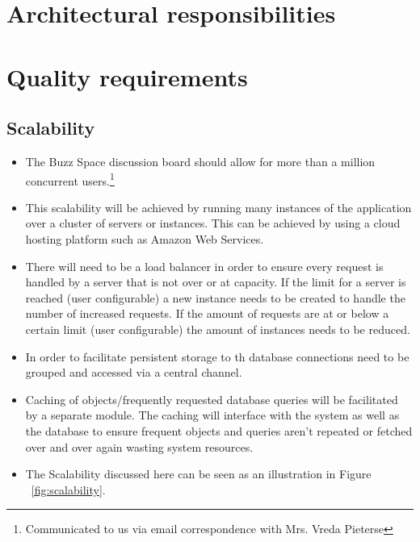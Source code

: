 \documentclass[a4paper,12pt,titlepage]{article}
\begin{document}
\section{Architectural responsibilities}

\pagebreak
\section{Quality requirements}
\subsection{Scalability}
\begin{itemize}
	\item The Buzz Space discussion board should allow for more than a million concurrent users.\footnote{Communicated to us via email correspondence with Mrs. Vreda Pieterse}
	\item This scalability will be achieved by running many instances of the application over a cluster of servers or instances. This can be achieved by using a cloud hosting platform such as Amazon Web Services.
	\item There will need to be a load balancer in order to ensure every request is handled by a server that is not over or at capacity. If the limit for a server is reached (user configurable) a new instance needs to be created to handle the number of increased requests. If the amount of requests are at or below a certain limit (user configurable) the amount of instances needs to be reduced.
	\item In order to facilitate persistent storage to th database connections need to be grouped and accessed via a central channel. 
	\item Caching of objects/frequently requested database queries will be facilitated by a separate module. The caching will interface with the system as well as the database to ensure frequent objects and queries aren't repeated or fetched over and over again wasting system resources.
	\item The Scalability discussed here can be seen as an illustration in Figure ~\ref{fig:scalability}.
	\begin{figure}[H]
		\centering

\end{figure}
\end{itemize}
\end{document}
